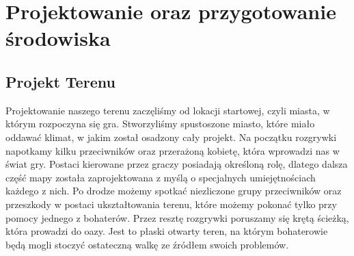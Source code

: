 \section{Projektowanie oraz przygotowanie środowiska}
\subsection{Projekt Terenu}
Projektowanie naszego terenu zaczęliśmy od lokacji startowej, czyli miasta, w którym rozpoczyna się gra. 
Stworzyliśmy spustoszone miasto, które miało oddawać klimat, w jakim został osadzony cały projekt. 
Na początku rozgrywki napotkamy kilku przeciwników oraz przerażoną kobietę, która wprowadzi nas w świat gry.  
Postaci kierowane przez graczy posiadają określoną rolę, dlatego dalsza część mapy została zaprojektowana z myślą o specjalnych umiejętnościach każdego z nich.
Po drodze możemy spotkać niezliczone grupy przeciwników oraz przeszkody w postaci ukształtowania terenu, które możemy pokonać tylko przy pomocy jednego z bohaterów.
Przez resztę rozgrywki poruszamy się krętą ścieżką, która prowadzi do oazy.
Jest to płaski otwarty teren, na którym bohaterowie będą mogli stoczyć ostateczną walkę ze źródłem swoich problemów.
